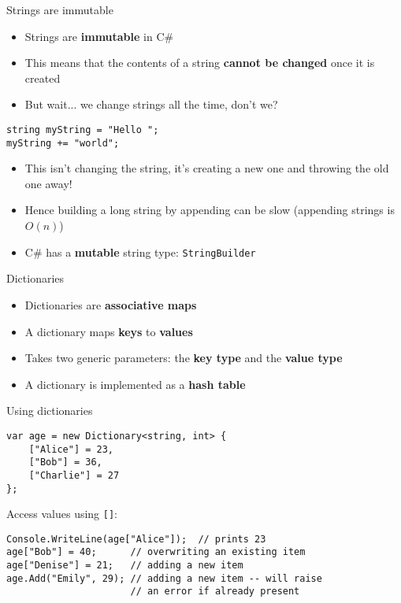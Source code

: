 \begin{frame}[fragile]{Strings are immutable}
	\begin{itemize}
		\pause\item Strings are \textbf{immutable} in C\#
		\pause\item This means that the contents of a string \textbf{cannot be changed} once it is created
		\pause\item But wait... we change strings all the time, don't we?
	\end{itemize}
	\begin{lstlisting}
string myString = "Hello ";
myString += "world";
	\end{lstlisting}
	\begin{itemize}
		\pause\item This isn't changing the string, it's creating a new one and throwing the old one away!
		\pause\item Hence building a long string by appending can be slow (appending strings is $O(n)$)
		\pause\item C\# has a \textbf{mutable} string type: \lstinline{StringBuilder}
	\end{itemize}
\end{frame}

\begin{frame}{Dictionaries}
	\begin{itemize}
		\pause\item Dictionaries are \textbf{associative maps}
		\pause\item A dictionary maps \textbf{keys} to \textbf{values}
		\pause\item Takes two generic parameters: the \textbf{key type} and the \textbf{value type}
		\pause\item A dictionary is implemented as a \textbf{hash table}
	\end{itemize}		
\end{frame}

\begin{frame}[fragile]{Using dictionaries}
	\begin{lstlisting}
var age = new Dictionary<string, int> {
    ["Alice"] = 23,
    ["Bob"] = 36,
    ["Charlie"] = 27
};
	\end{lstlisting}
	\pause Access values using \lstinline{[]}:
	\begin{lstlisting}
Console.WriteLine(age["Alice"]);  // prints 23
age["Bob"] = 40;      // overwriting an existing item
age["Denise"] = 21;   // adding a new item
age.Add("Emily", 29); // adding a new item -- will raise
                      // an error if already present
	\end{lstlisting}
\end{frame}

